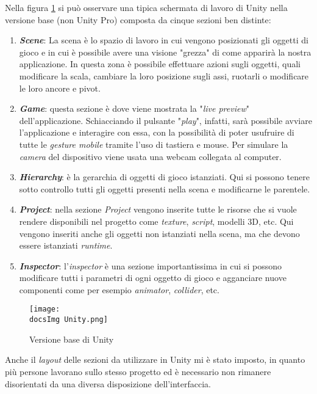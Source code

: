 Nella figura \ref{fig:Versione base di Unity} si pu\`o osservare una tipica schermata di lavoro di Unity nella versione base (non Unity Pro) composta da cinque sezioni ben distinte:
\begin{enumerate}
	\item \textbf{\textit{Scene}}: La scena \`e lo spazio di lavoro in cui vengono posizionati gli oggetti di gioco e in cui \`e possibile avere una visione "grezza" di come apparir\`a la nostra applicazione. In questa zona \`e possibile effettuare azioni sugli oggetti, quali modificare la scala, cambiare la loro posizione sugli assi, ruotarli o modificare le loro ancore e pivot.
	\item \textbf{\textit{Game}}: questa sezione \`e dove viene mostrata la "\textit{live preview}" dell'applicazione. Schiacciando il pulsante "\textit{play}", infatti, sar\`a possibile avviare l'applicazione e interagire con essa, con la possibilit\`a di poter usufruire di tutte le \textit{gesture mobile} tramite l'uso di tastiera e mouse. Per simulare la \textit{camera} del dispositivo viene usata una webcam collegata al computer.
	\item \textbf{\textit{Hierarchy}}: \`e la gerarchia di oggetti di gioco istanziati. Qui si possono tenere sotto controllo tutti gli oggetti presenti nella scena e modificarne le parentele.
	\item \textbf{\textit{Project}}: nella sezione \textit{Project} vengono inserite tutte le risorse che si vuole rendere disponibili nel progetto come \textit{texture\gloss}, \textit{script}, modelli 3D, etc. Qui vengono inseriti anche gli oggetti non istanziati nella scena, ma che devono essere istanziati \textit{runtime}.
	\item \textbf{\textit{Inspector}}: l'\textit{inspector} \`e una sezione importantissima in cui si possono modificare tutti i parametri di ogni oggetto di gioco e agganciare nuove componenti come per esempio \textit{animator}, \textit{collider\gloss}, etc.
\end{enumerate}

\begin{figure}[H]
	\centering
	\texttt{[image: \\docsImg Unity.png]}
	\caption{Versione base di Unity}
	\label{fig:Versione base di Unity}
\end{figure}

Anche il \textit{layout} delle sezioni da utilizzare in Unity mi \`e stato imposto, in quanto pi\`u persone lavorano sullo stesso progetto ed \`e necessario non rimanere disorientati da una diversa disposizione dell'interfaccia.

